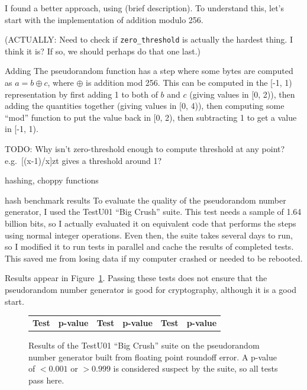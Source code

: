 \documentclass[twocolumn]{article}
\begin{document}
I found a better approach, using (brief description).
To understand this, let's start with the implementation of addition modulo 256.

(ACTUALLY: Need to check if \verb+zero_threshold+ is actually the hardest thing. I think it is? If so, we should perhaps do that one last.)

Adding
The pseudorandom function has a step where some bytes are computed as $a = b \oplus c$, where $\oplus$ is addition mod 256. This can be computed in the [-1, 1) representation by first
adding 1 to both of $b$ and $c$ (giving values in [0, 2)), then adding the quantities together (giving values in [0, 4)), then computing some ``mod'' function to put the value back in [0, 2), then subtracting 1 to get a value in [-1, 1).

TODO: Why isn't zero-threshold enough to compute threshold at any point? e.g.~[(x-1)/x]zt gives a threshold around 1?

hashing,
choppy functions


hash benchmark results
To evaluate the quality of the pseudorandom number generator, I used the TestU01 ``Big Crush'' suite. This test needs a sample of 1.64 billion bits, so I actually evaluated it on equivalent code that performs the steps using normal integer operations. Even then, the suite takes several days to run, so I modified it to run tests in parallel and cache the results of completed tests. This saved me from losing data if my computer crashed or needed to be rebooted.

Results appear in Figure~\ref{fig:testu01}. Passing these tests does
not ensure that the pseudorandom number generator is good for
cryptography, although it is a good start.

\begin{figure}[tp]
  \footnotesize
  \begin{tabular}{rl|rl|rl}
    {\bf Test} & {\bf p-value} &
    {\bf Test} & {\bf p-value} &
    {\bf Test} & {\bf p-value} \\
    
  \end{tabular}
  \caption{
    Results of the TestU01 ``Big Crush'' suite on the
    pseudorandom number generator built from floating point roundoff
    error. A p-value of $< 0.001$ or $> 0.999$ is considered
    suspect by the suite, so all tests pass here.
  } \label{fig:testu01}
\end{figure}
\end{document}

